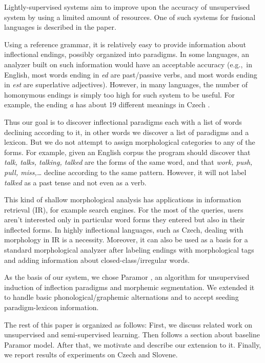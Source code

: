 \documentclass{itatnew}
\newcommand{\e}[1]{\textit{#1}} %
\newcommand{\eg}{e.g.,~}
\begin{document}
Lightly-supervised systems aim to improve upon the accuracy of unsupervised system by using a limited amount of resources. One of such systems for fusional languages is described in the paper.

Using a reference grammar, it is relatively easy to provide information about inflectional endings, possibly organized into paradigms. In some languages, an analyzer built on such information would have an acceptable accuracy (\eg in English, most words ending in \e{ed} are past/passive verbs, and most words ending in \e{est} are superlative adjectives). However, in many languages, the number of homonymous endings is simply too high for such system to be useful. For example, the ending \e{a} has about 19 different meanings in Czech \cite{feldman-hana-2010-rodopi}.

Thus our goal is to discover inflectional paradigms each with a list of words declining according to it, in other words we discover a list of paradigms and a lexicon. But we do not attempt to assign morphological categories to any of the forms. For example, given an English corpus the program should discover that \e{talk, talks, talking, talked} are the forms of the same word, and that \e{work, push, pull, miss,\ldots} decline according to the same pattern. However, it will not label \e{talked} as a past tense and not even as a verb.

This kind of shallow morphological analysis has applications in information retrieval (IR), for example search engines. For the most of the queries, users aren't interested only in particular word forms they entered but also in their inflected forms. In highly inflectional languages, such as Czech, dealing with morphology in IR is a necessity. Moreover, it can also be used as a basis for a standard morphological analyzer after labeling endings with morphological tags and adding information about closed-class/irregular words.

As the basis of our system, we chose Paramor \cite{monson09}, an algorithm for unsupervised induction of inflection paradigms and morphemic segmentation. We extended it to handle basic phonological/graphemic alternations and to accept seeding paradigm-lexicon information.


The rest of this paper is organized as follows: First, we discuss related work on unsupervised and semi-supervised learning. Then follows a section about baseline Paramor model. After that, we motivate and describe our extension to it. Finally, we report results of experiments on Czech and Slovene.
\end{document}

